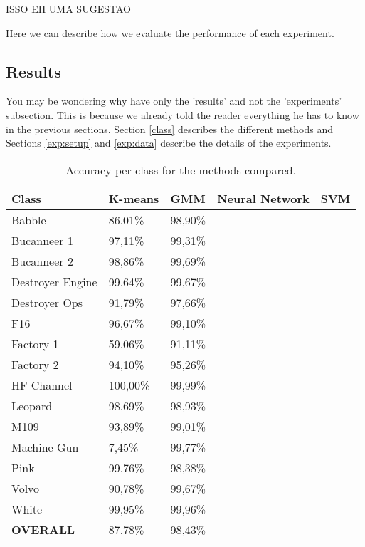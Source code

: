 \documentclass[12pt]{article}
\begin{document}
ISSO EH UMA SUGESTAO

Here we can describe how we evaluate the performance of each experiment.

\subsection{Results} \label{exp:res}

You may be wondering why have only the 'results' and not the 'experiments' subsection. This is because we already told the reader everything he has to know in the previous sections. Section \ref{class} describes the different methods and Sections \ref{exp:setup} and \ref{exp:data} describe the details of the experiments.


\begin{table}[ht]
\centering
\caption{Accuracy per class for the methods compared.}
\label{tab:acc}
\begin{tabular}{l|llll}
\hline
Class & K-means & GMM & Neural Network & SVM \\
\hline
Babble & 86,01\% & 98,90\% & & \\
Bucanneer 1 & 97,11\% & 99,31\% & & \\
Bucanneer 2 & 98,86\% & 99,69\% & & \\
Destroyer Engine & 99,64\% & 99,67\% & & \\
Destroyer Ops & 91,79\% & 97,66\% & &\\
F16 & 96,67\% & 99,10\% & &\\
Factory 1 & 59,06\% & 91,11\% & &\\
Factory 2 & 94,10\% & 95,26\% & &\\
HF Channel & 100,00\% & 99,99\% & &\\
Leopard & 98,69\% & 98,93\% & &\\
M109 & 93,89\% & 99,01\% & &\\
Machine Gun & 7,45\% & 99,77\% & &\\
Pink & 99,76\% & 98,38\% & &\\
Volvo & 90,78\% & 99,67\% & &\\
White & 99,95\% & 99,96\% & &\\
\hline
\textbf{OVERALL} & 87,78\% & 98,43\% & & \\
\hline
\end{tabular}
\end{table}
\end{document}
